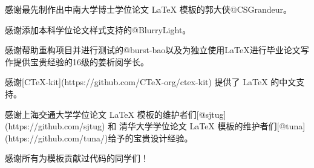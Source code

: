 \begin{acknowledgements} 

感谢最先制作出中南大学博士学位论文 LaTeX 模板的郭大侠@CSGrandeur。

感谢添加本科学位论文样式支持的@BlurryLight。

感谢帮助重构项目并进行测试的@burst-bao以及为独立使用LaTeX进行毕业论文写作提供宝贵经验的16级的姜析阅学长。

感谢[CTeX-kit](https://github.com/CTeX-org/ctex-kit) 提供了 LaTeX 的中文支持。

感谢上海交通大学学位论文 LaTeX 模板的维护者们[@sjtug](https://github.com/sjtug) 和 清华大学学位论文 LaTeX 模板的维护者们[@tuna](https://github.com/tuna/)给予的宝贵设计经验。

感谢所有为模板贡献过代码的同学们！

\end{acknowledgements}
